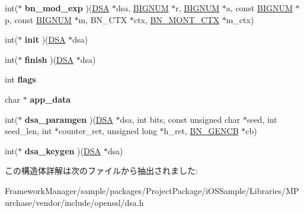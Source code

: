 \begin{DoxyCompactItemize}
\item 
\hypertarget{structdsa__method_afeec883c6d822b9faa7a03f2217fc651}{}int($\ast$ {\bfseries bn\+\_\+mod\+\_\+exp} )(\hyperlink{structdsa__st}{D\+S\+A} $\ast$dsa, \hyperlink{structbignum__st}{B\+I\+G\+N\+U\+M} $\ast$r, \hyperlink{structbignum__st}{B\+I\+G\+N\+U\+M} $\ast$a, const \hyperlink{structbignum__st}{B\+I\+G\+N\+U\+M} $\ast$p, const \hyperlink{structbignum__st}{B\+I\+G\+N\+U\+M} $\ast$m, B\+N\+\_\+\+C\+T\+X $\ast$ctx, \hyperlink{structbn__mont__ctx__st}{B\+N\+\_\+\+M\+O\+N\+T\+\_\+\+C\+T\+X} $\ast$m\+\_\+ctx)\label{structdsa__method_afeec883c6d822b9faa7a03f2217fc651}

\item 
\hypertarget{structdsa__method_acfaf05310756308b9849f278cdfd91c6}{}int($\ast$ {\bfseries init} )(\hyperlink{structdsa__st}{D\+S\+A} $\ast$dsa)\label{structdsa__method_acfaf05310756308b9849f278cdfd91c6}

\item 
\hypertarget{structdsa__method_aad9fed78046fe8c6f995ba9ee8bd59d2}{}int($\ast$ {\bfseries finish} )(\hyperlink{structdsa__st}{D\+S\+A} $\ast$dsa)\label{structdsa__method_aad9fed78046fe8c6f995ba9ee8bd59d2}

\item 
\hypertarget{structdsa__method_ae5a10b0b8d5b139e5818da8da5223ebc}{}int {\bfseries flags}\label{structdsa__method_ae5a10b0b8d5b139e5818da8da5223ebc}

\item 
\hypertarget{structdsa__method_a08528c35da49dcebc0675cb9b66bbeb9}{}char $\ast$ {\bfseries app\+\_\+data}\label{structdsa__method_a08528c35da49dcebc0675cb9b66bbeb9}

\item 
\hypertarget{structdsa__method_a22d30cb3e62b00cbb818f7d2bacb99f7}{}int($\ast$ {\bfseries dsa\+\_\+paramgen} )(\hyperlink{structdsa__st}{D\+S\+A} $\ast$dsa, int bits, const unsigned char $\ast$seed, int seed\+\_\+len, int $\ast$counter\+\_\+ret, unsigned long $\ast$h\+\_\+ret, \hyperlink{structbn__gencb__st}{B\+N\+\_\+\+G\+E\+N\+C\+B} $\ast$cb)\label{structdsa__method_a22d30cb3e62b00cbb818f7d2bacb99f7}

\item 
\hypertarget{structdsa__method_a55bf9cc2d75b43788806388a6e924eb1}{}int($\ast$ {\bfseries dsa\+\_\+keygen} )(\hyperlink{structdsa__st}{D\+S\+A} $\ast$dsa)\label{structdsa__method_a55bf9cc2d75b43788806388a6e924eb1}

\end{DoxyCompactItemize}


この構造体詳解は次のファイルから抽出されました\+:\begin{DoxyCompactItemize}
\item 
Framework\+Manager/sample/packages/\+Project\+Package/i\+O\+S\+Sample/\+Libraries/\+M\+Purchase/vendor/include/openssl/dsa.\+h\end{DoxyCompactItemize}
